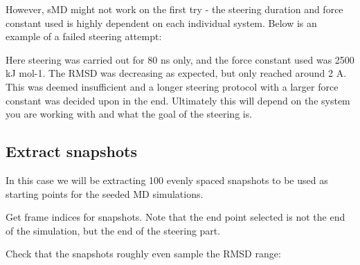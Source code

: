 However, sMD might not work on the first try - the steering duration and
force constant used is highly dependent on each individual system. Below
is an example of a failed steering attempt:

Here steering was carried out for 80 ns only, and the force constant
used was 2500 kJ mol-1. The RMSD was decreasing as expected, but only
reached around 2 A. This was deemed insufficient and a longer steering
protocol with a larger force constant was decided upon in the end.
Ultimately this will depend on the system you are working with and what
the goal of the steering is.

\hypertarget{extract-snapshots}{%
\subsection{Extract snapshots}\label{extract-snapshots}}

In this case we will be extracting 100 evenly spaced snapshots to be
used as starting points for the seeded MD simulations.

\begin{Shaded}
\begin{Highlighting}[]
\OperatorTok{=} 
 
\end{Highlighting}
\end{Shaded}

Get frame indices for snapshots. Note that the end point selected is not
the end of the simulation, but the end of the steering part.

\begin{Shaded}
\begin{Highlighting}[]
\OperatorTok{=} 
\OperatorTok{=}  \OperatorTok{/} 
\OperatorTok{=}\OperatorTok{=}\NormalTok{)}
\end{Highlighting}
\end{Shaded}

Check that the snapshots roughly even sample the RMSD range:

\begin{Shaded}
\begin{Highlighting}[]
\OperatorTok{=}\NormalTok{ df[}\NormalTok{].iloc[frames].plot(figsize}\OperatorTok{=}\NormalTok{(}\NormalTok{,}\NormalTok{))}
\NormalTok{)}
\NormalTok{)}
\NormalTok{, }\NormalTok{)}
\end{Highlighting}
\end{Shaded}

